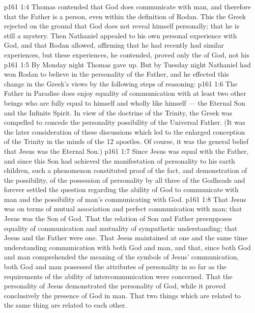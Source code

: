 \vs p161 1:4 Thomas contended that God does communicate with man, and therefore that the Father is a person, even within the definition of Rodan. This the Greek rejected on the ground that God does not reveal himself personally; that he is still a mystery. Then Nathaniel appealed to his own personal experience with God, and that Rodan allowed, affirming that he had recently had similar experiences, but these experiences, he contended, proved only the  of God, not his 
\vs p161 1:5 By Monday night Thomas gave up. But by Tuesday night Nathaniel had won Rodan to believe in the personality of the Father, and he effected this change in the Greek’s views by the following steps of reasoning:
\vs p161 1:6 \bibnobreakspace The Father in Paradise does enjoy equality of communication with at least two other beings who are fully equal to himself and wholly like himself --- the Eternal Son and the Infinite Spirit. In view of the doctrine of the Trinity, the Greek was compelled to concede the personality possibility of the Universal Father. (It was the later consideration of these discussions which led to the enlarged conception of the Trinity in the minds of the 12 apostles. Of course, it was the general belief that Jesus was the Eternal Son.)
\vs p161 1:7 \bibnobreakspace Since Jesus was equal with the Father, and since this Son had achieved the manifestation of personality to his earth children, such a phenomenon constituted proof of the fact, and demonstration of the possibility, of the possession of personality by all three of the Godheads and forever settled the question regarding the ability of God to communicate with man and the possibility of man’s communicating with God.
\vs p161 1:8 \bibnobreakspace That Jesus was on terms of mutual association and perfect communication with man; that Jesus was the Son of God. That the relation of Son and Father presupposes equality of communication and mutuality of sympathetic understanding; that Jesus and the Father were one. That Jesus maintained at one and the same time understanding communication with both God and man, and that, since both God and man comprehended the meaning of the symbols of Jesus’ communication, both God and man possessed the attributes of personality in so far as the requirements of the ability of intercommunication were concerned. That the personality of Jesus demonstrated the personality of God, while it proved conclusively the presence of God in man. That two things which are related to the same thing are related to each other.
